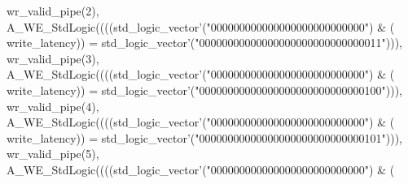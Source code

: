 \begin{DoxyCode}
{      wr_valid_pipe}\textcolor{vhdlchar}{(}\textcolor{vhdllogic}{}\textcolor{vhdllogic}{2}\textcolor{vhdlchar}{)}\textcolor{vhdlchar}{,} \textcolor{vhdlchar}{A\_WE\_StdLogic}\textcolor{vhdlchar}{(}\textcolor{vhdlchar}{(}\textcolor{vhdlchar}{(}\textcolor{vhdlchar}{(}\textcolor{comment}{std\_logic\_vector}\textcolor{vhdlchar}{'}\textcolor{vhdlchar}{(}\textcolor{vhdllogic}{"000000000000000000000000000"}\textcolor{vhdlchar}{)} \textcolor{vhdlchar}{&} \textcolor{vhdlchar}{(}\textcolor{vhdlchar}{
      write_latency}\textcolor{vhdlchar}{)}\textcolor{vhdlchar}{)} \textcolor{vhdlchar}{=} \textcolor{comment}{std\_logic\_vector}\textcolor{vhdlchar}{'}\textcolor{vhdlchar}{(}\textcolor{vhdllogic}{"00000000000000000000000000000011"}\textcolor{vhdlchar}{)}\textcolor{vhdlchar}{)}\textcolor{vhdlchar}{)}\textcolor{vhdlchar}{,} \textcolor{vhdlchar}{
      wr_valid_pipe}\textcolor{vhdlchar}{(}\textcolor{vhdllogic}{}\textcolor{vhdllogic}{3}\textcolor{vhdlchar}{)}\textcolor{vhdlchar}{,} \textcolor{vhdlchar}{A\_WE\_StdLogic}\textcolor{vhdlchar}{(}\textcolor{vhdlchar}{(}\textcolor{vhdlchar}{(}\textcolor{vhdlchar}{(}\textcolor{comment}{std\_logic\_vector}\textcolor{vhdlchar}{'}\textcolor{vhdlchar}{(}\textcolor{vhdllogic}{"000000000000000000000000000"}\textcolor{vhdlchar}{)} \textcolor{vhdlchar}{&} \textcolor{vhdlchar}{(}\textcolor{vhdlchar}{
      write_latency}\textcolor{vhdlchar}{)}\textcolor{vhdlchar}{)} \textcolor{vhdlchar}{=} \textcolor{comment}{std\_logic\_vector}\textcolor{vhdlchar}{'}\textcolor{vhdlchar}{(}\textcolor{vhdllogic}{"00000000000000000000000000000100"}\textcolor{vhdlchar}{)}\textcolor{vhdlchar}{)}\textcolor{vhdlchar}{)}\textcolor{vhdlchar}{,} \textcolor{vhdlchar}{
      wr_valid_pipe}\textcolor{vhdlchar}{(}\textcolor{vhdllogic}{}\textcolor{vhdllogic}{4}\textcolor{vhdlchar}{)}\textcolor{vhdlchar}{,} \textcolor{vhdlchar}{A\_WE\_StdLogic}\textcolor{vhdlchar}{(}\textcolor{vhdlchar}{(}\textcolor{vhdlchar}{(}\textcolor{vhdlchar}{(}\textcolor{comment}{std\_logic\_vector}\textcolor{vhdlchar}{'}\textcolor{vhdlchar}{(}\textcolor{vhdllogic}{"000000000000000000000000000"}\textcolor{vhdlchar}{)} \textcolor{vhdlchar}{&} \textcolor{vhdlchar}{(}\textcolor{vhdlchar}{
      write_latency}\textcolor{vhdlchar}{)}\textcolor{vhdlchar}{)} \textcolor{vhdlchar}{=} \textcolor{comment}{std\_logic\_vector}\textcolor{vhdlchar}{'}\textcolor{vhdlchar}{(}\textcolor{vhdllogic}{"00000000000000000000000000000101"}\textcolor{vhdlchar}{)}\textcolor{vhdlchar}{)}\textcolor{vhdlchar}{)}\textcolor{vhdlchar}{,} \textcolor{vhdlchar}{
      wr_valid_pipe}\textcolor{vhdlchar}{(}\textcolor{vhdllogic}{}\textcolor{vhdllogic}{5}\textcolor{vhdlchar}{)}\textcolor{vhdlchar}{,} \textcolor{vhdlchar}{A\_WE\_StdLogic}\textcolor{vhdlchar}{(}\textcolor{vhdlchar}{(}\textcolor{vhdlchar}{(}\textcolor{vhdlchar}{(}\textcolor{comment}{std\_logic\_vector}\textcolor{vhdlchar}{'}\textcolor{vhdlchar}{(}\textcolor{vhdllogic}{"000000000000000000000000000"}\textcolor{vhdlchar}{)} \textcolor{vhdlchar}{&} \textcolor{vhdlchar}{(}\textcolor{vhdlchar}{
}
\end{DoxyCode}

